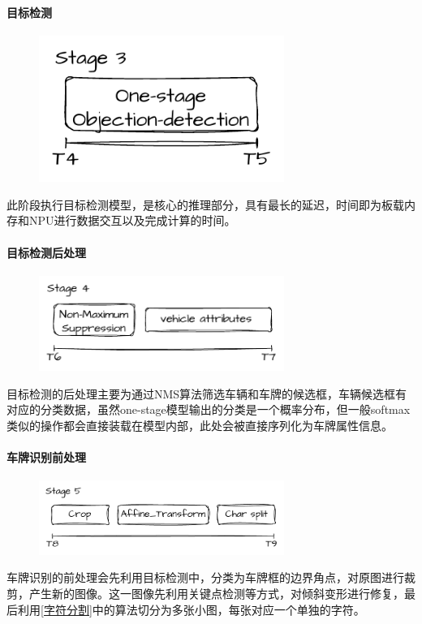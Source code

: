 \documentclass[master,anonymous]{shtthesis}
\begin{document}
\paragraph{目标检测}
\begin{figure}[H]
	\centering
	\includegraphics[width=8cm]{img/s3.pdf}
	\label{目标检测阶段阶段}
\end{figure}
此阶段执行目标检测模型，是核心的推理部分，具有最长的延迟，时间即为板载内存和NPU进行数据交互以及完成计算的时间。

\paragraph{目标检测后处理}
\begin{figure}[H]
	\centering
	\includegraphics[width=8cm]{img/s4.pdf}
	\label{目标检测后处理阶段阶段}
\end{figure}
目标检测的后处理主要为通过NMS算法筛选车辆和车牌的候选框，车辆候选框有对应的分类数据，虽然one-stage模型输出的分类是一个概率分布，但一般softmax类似的操作都会直接装载在模型内部，此处会被直接序列化为车牌属性信息。

\paragraph{车牌识别前处理}
\begin{figure}[H]
	\centering
	\includegraphics[width=8cm]{img/s5.pdf}
	\label{车牌识别前处理阶段}
\end{figure}
车牌识别的前处理会先利用目标检测中，分类为车牌框的边界角点，对原图进行裁剪，产生新的图像。这一图像先利用关键点检测等方式，对倾斜变形进行修复，最后利用\ref{字符分割}中的算法切分为多张小图，每张对应一个单独的字符。
\end{document}
